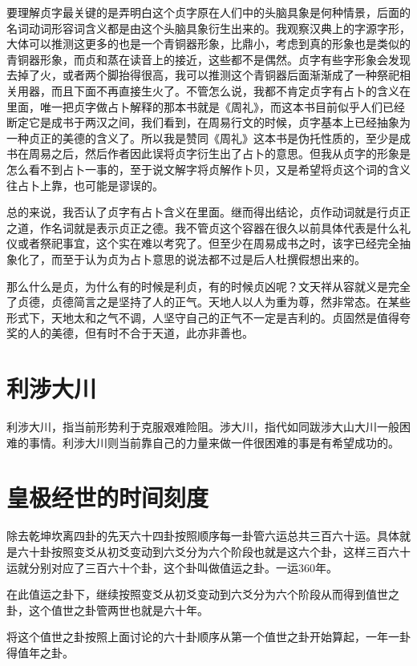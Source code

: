 \documentclass[12pt,oneside]{book}
\begin{document}
要理解贞字最关键的是弄明白这个贞字原在人们中的头脑具象是何种情景，后面的名词动词形容词含义都是由这个头脑具象衍生出来的。我观察汉典上的字源字形，大体可以推测这更多的也是一个青铜器形象，比鼎小，考虑到真的形象也是类似的青铜器形象，而贞和蒸在读音上的接近，这些都不是偶然。贞字有些字形象会发现去掉了火，或者两个脚抬得很高，我可以推测这个青铜器后面渐渐成了一种祭祀相关用器，而且下面不再直接生火了。不管怎么说，我都不肯定贞字有占卜的含义在里面，唯一把贞字做占卜解释的那本书就是《周礼》，而这本书目前似乎人们已经断定它是成书于两汉之间，我们看到，在周易行文的时候，贞字基本上已经抽象为一种贞正的美德的含义了。所以我是赞同《周礼》这本书是伪托性质的，至少是成书在周易之后，然后作者因此误将贞字衍生出了占卜的意思。但我从贞字的形象是怎么看不到占卜一事的，至于说文解字将贞解作卜贝，又是希望将贞这个词的含义往占卜上靠，也可能是谬误的。

总的来说，我否认了贞字有占卜含义在里面。继而得出结论，贞作动词就是行贞正之道，作名词就是表示贞正之德。我不管贞这个容器在很久以前具体代表是什么礼仪或者祭祀事宜，这个实在难以考究了。但至少在周易成书之时，该字已经完全抽象化了，而至于认为贞为占卜意思的说法都不过是后人杜撰假想出来的。

那么什么是贞，为什么有的时候是利贞，有的时候贞凶呢？文天祥从容就义是完全了贞德，贞德简言之是坚持了人的正气。天地人以人为重为尊，然非常态。在某些形式下，天地太和之气不调，人坚守自己的正气不一定是吉利的。贞固然是值得夸奖的人的美德，但有时不合于天道，此亦非善也。

\section{利涉大川}
利涉大川，指当前形势利于克服艰难险阻。涉大川，指代如同跋涉大山大川一般困难的事情。利涉大川则当前靠自己的力量来做一件很困难的事是有希望成功的。


\section{皇极经世的时间刻度}
除去乾坤坎离四卦的先天六十四卦按照顺序每一卦管六运总共三百六十运。具体就是六十卦按照变爻从初爻变动到六爻分为六个阶段也就是这六个卦，这样三百六十运就分别对应了三百六十个卦，这个卦叫做值运之卦。一运360年。

在此值运之卦下，继续按照变爻从初爻变动到六爻分为六个阶段从而得到值世之卦，这个值世之卦管两世也就是六十年。

将这个值世之卦按照上面讨论的六十卦顺序从第一个值世之卦开始算起，一年一卦得值年之卦。
\end{document}

